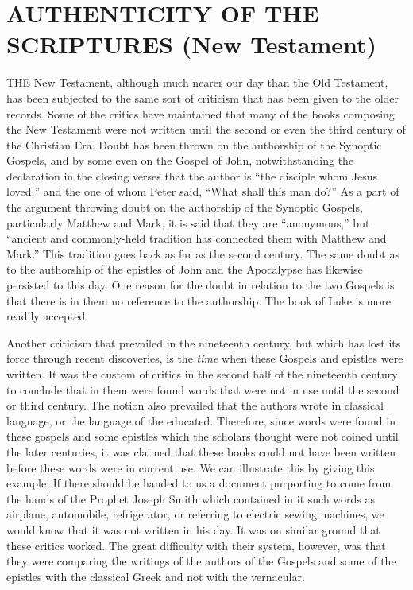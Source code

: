 \chapter{AUTHENTICITY OF THE SCRIPTURES (New Testament)}

THE New Testament, although much nearer our day than the Old Testament, has been
subjected to the same sort of criticism that has been given to the older records. Some of the
critics have maintained that many of the books composing the New Testament were not
written until the second or even the third century of the Christian Era. Doubt has been thrown
on the authorship of the Synoptic Gospels, and by some even on the Gospel of John,
notwithstanding the declaration in the closing verses that the author is ``the disciple whom
Jesus loved,'' and the one of whom Peter said, ``What shall this man do?'' As a part of the
argument throwing doubt on the authorship of the Synoptic Gospels, particularly Matthew
and Mark, it is said that they are ``anonymous,'' but ``ancient and commonly-held tradition has
connected them with Matthew and Mark.'' This tradition goes back as far as the second
century. The same doubt as to the authorship of the epistles of John and the Apocalypse has
likewise persisted to this day. One reason for the doubt in relation to the two Gospels is that
there is in them no reference to the authorship. The book of Luke is more readily accepted.

Another criticism that prevailed in the nineteenth century, but which has lost its force
through recent discoveries, is the \textit{time} when these Gospels and epistles were written. It was
the custom of critics in the second half of the nineteenth century to conclude that in them
were found words that were not in use until the second or third century. The notion also
prevailed that the authors wrote in classical language, or the language of the educated.
Therefore, since words were found in these gospels and some epistles which the scholars
thought were not coined until the later centuries, it was claimed that these books could not
have been written before these words were in current use. We can illustrate this by giving
this example: If there should be handed to us a document purporting to come from the hands
of the Prophet Joseph Smith which contained in it such words as airplane, automobile,
refrigerator, or referring to electric sewing machines, we would know that it was not written
in his day. It was on similar ground that these critics worked. The great difficulty with their
system, however, was that they were comparing the writings of the authors of the Gospels
and some of the epistles with the classical Greek and not with the vernacular.


